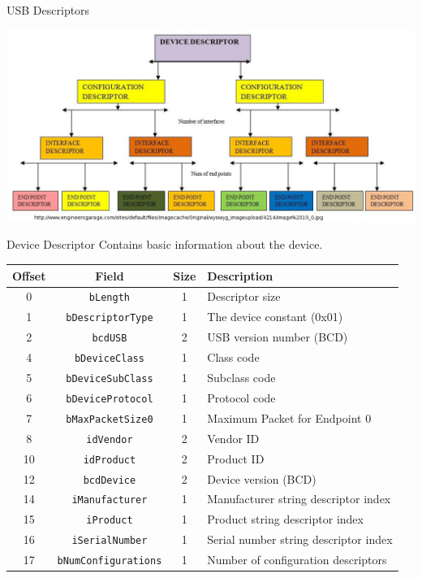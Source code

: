 \documentclass[pdf]{beamer}
\begin{document}
\begin{frame}{USB Descriptors}
  \transdissolve
  \begin{center}
    \includegraphics[scale=0.3]{img/descriptors.jpg}
  \end{center}
\end{frame}

\begin{frame}{Device Descriptor}
  \transdissolve
  Contains basic information about the device.
  \begin{table}
    \tiny
    \begin{tabular}{| c | c | c | l |}
      \hline
      \textbf{Offset} & \textbf{Field} & \textbf{Size} & \textbf{Description} \\ \hline \hline
      0 & \texttt{bLength} & 1 & Descriptor size \\ \hline
      1 & \texttt{bDescriptorType} & 1 & The device constant (0x01) \\ \hline
      2 & \texttt{bcdUSB} & 2 & USB version number (BCD) \\ \hline
      4 & \texttt{bDeviceClass} & 1 & Class code \\ \hline
      5 & \texttt{bDeviceSubClass} & 1 & Subclass code \\ \hline
      6 & \texttt{bDeviceProtocol} & 1 & Protocol code \\ \hline
      7 & \texttt{bMaxPacketSize0} & 1 & Maximum Packet for Endpoint 0 \\ \hline
      8 & \texttt{idVendor} & 2 & Vendor ID \\ \hline
      10 & \texttt{idProduct} & 2 & Product ID \\ \hline
      12 & \texttt{bcdDevice} & 2 & Device version (BCD) \\ \hline
      14 & \texttt{iManufacturer} & 1 & Manufacturer string descriptor index \\ \hline
      15 & \texttt{iProduct} & 1 & Product string descriptor index \\ \hline
      16 & \texttt{iSerialNumber} & 1 & Serial number string descriptor index \\ \hline
      17 & \texttt{bNumConfigurations} & 1 & Number of configuration descriptors \\ \hline
    \end{tabular}
  \end{table}
\end{frame}
\end{document}

